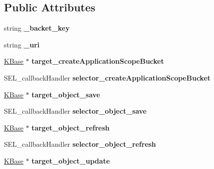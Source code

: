 \subsection*{Public Attributes}
\begin{DoxyCompactItemize}
\item 
\hypertarget{class_c_kii_bucket_ae62e874439f55143f8009f88da23bc99}{string {\bfseries \-\_\-backet\-\_\-key}}\label{class_c_kii_bucket_ae62e874439f55143f8009f88da23bc99}

\item 
\hypertarget{class_c_kii_bucket_aa18c6b0053f2e0a2a07c33e5dc490802}{string {\bfseries \-\_\-uri}}\label{class_c_kii_bucket_aa18c6b0053f2e0a2a07c33e5dc490802}

\item 
\hypertarget{class_c_kii_bucket_ae8370c81ec4a95e4ac70a169cf961fec}{\hyperlink{class_k_base}{K\-Base} $\ast$ {\bfseries target\-\_\-create\-Application\-Scope\-Bucket}}\label{class_c_kii_bucket_ae8370c81ec4a95e4ac70a169cf961fec}

\item 
\hypertarget{class_c_kii_bucket_a4a5b74eb7eea8c621668c2cd8a5f7cb4}{S\-E\-L\-\_\-callback\-Handler {\bfseries selector\-\_\-create\-Application\-Scope\-Bucket}}\label{class_c_kii_bucket_a4a5b74eb7eea8c621668c2cd8a5f7cb4}

\item 
\hypertarget{class_c_kii_bucket_af1895babf08776445963b708b353c018}{\hyperlink{class_k_base}{K\-Base} $\ast$ {\bfseries target\-\_\-object\-\_\-save}}\label{class_c_kii_bucket_af1895babf08776445963b708b353c018}

\item 
\hypertarget{class_c_kii_bucket_a90b8bf7cb1cc5ed6c299a574833f3fd2}{S\-E\-L\-\_\-callback\-Handler {\bfseries selector\-\_\-object\-\_\-save}}\label{class_c_kii_bucket_a90b8bf7cb1cc5ed6c299a574833f3fd2}

\item 
\hypertarget{class_c_kii_bucket_a2cddd650bd5f0929ccc037091742cbbd}{\hyperlink{class_k_base}{K\-Base} $\ast$ {\bfseries target\-\_\-object\-\_\-refresh}}\label{class_c_kii_bucket_a2cddd650bd5f0929ccc037091742cbbd}

\item 
\hypertarget{class_c_kii_bucket_ac9e641126b3d8315b2b41c55f829190b}{S\-E\-L\-\_\-callback\-Handler {\bfseries selector\-\_\-object\-\_\-refresh}}\label{class_c_kii_bucket_ac9e641126b3d8315b2b41c55f829190b}

\item 
\hypertarget{class_c_kii_bucket_aff6252ae8e0042bad122181ce5c4aedb}{\hyperlink{class_k_base}{K\-Base} $\ast$ {\bfseries target\-\_\-object\-\_\-update}}\label{class_c_kii_bucket_aff6252ae8e0042bad122181ce5c4aedb}


\end{DoxyCompactItemize}
